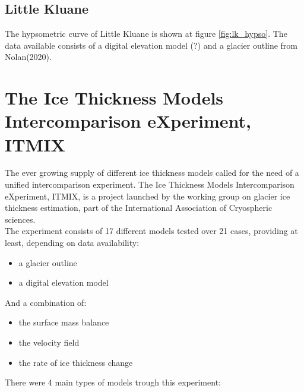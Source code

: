 \documentclass[a4, 12pt]{article}
\begin{document}
\subsection{Little Kluane}
The hypsometric curve of Little Kluane is shown at figure \ref{fig:lk_hypso}. The data available consists of a digital elevation model (?) and a glacier outline from Nolan(2020). 


\section{The Ice Thickness Models Intercomparison eXperiment, ITMIX}
The ever growing supply of different ice thickness models called for the need of a unified intercomparison experiment. The Ice Thickness Models Intercomparison eXperiment, ITMIX, is a project launched by the working group on glacier ice thickness estimation, part of the International Association of Cryospheric sciences.\\
The experiment consists of 17 different models tested over 21 cases, providing at least, depending on data availability:
\begin{itemize}
\item a glacier outline
\item a digital elevation model
\end{itemize}
And a combination of:
\begin{itemize}
\item the surface mass balance
\item the velocity field
\item the rate of ice thickness change
\end{itemize}
There were 4 main types of models trough this experiment:
\end{document}
